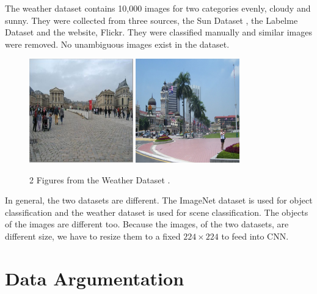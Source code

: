 The weather dataset \citep{lutwo} contains 10,000 images for two categories evenly, cloudy and sunny. They were collected from three sources, the Sun Dataset \citep{russell2008labelme}, the Labelme Dataset \citep{xiao2010sun} and the website, Flickr. They were classified manually and similar images were removed. No unambiguous images exist in the dataset.
\graphicspath{ {./Figures/} }
\begin{figure}[!htb]
    \centering
	\includegraphics[width=0.4\textwidth]{cloudy_0001.png}
    \qquad
    \includegraphics[width=0.4\textwidth]{sunny_0003.png}
    \caption{2 Figures from the Weather Dataset \citep{lutwo}.}%
    \label{fig:WeatherExamples}%
\end{figure}

In general, the two datasets are different. The ImageNet dataset is used for object classification and the weather dataset is used for scene classification. The objects of the images are different too. Because the images, of the two datasets, are different size, we have to resize them to a fixed $224 \times 224$ to feed into CNN.

\section{Data Argumentation}

